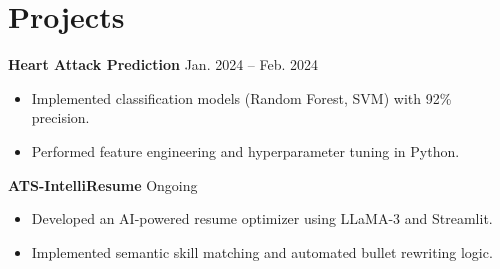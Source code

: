 \documentclass[letterpaper,10pt]{article}
\begin{document}
\section{Projects}
\textbf{Heart Attack Prediction} \hfill Jan. 2024 -- Feb. 2024
\begin{itemize}[noitemsep]
    \item Implemented classification models (Random Forest, SVM) with 92\% precision.
    \item Performed feature engineering and hyperparameter tuning in Python.
\end{itemize}

\textbf{ATS-IntelliResume} \hfill Ongoing
\begin{itemize}[noitemsep]
    \item Developed an AI-powered resume optimizer using LLaMA-3 and Streamlit.
    \item Implemented semantic skill matching and automated bullet rewriting logic.
\end{itemize}
\end{document}
